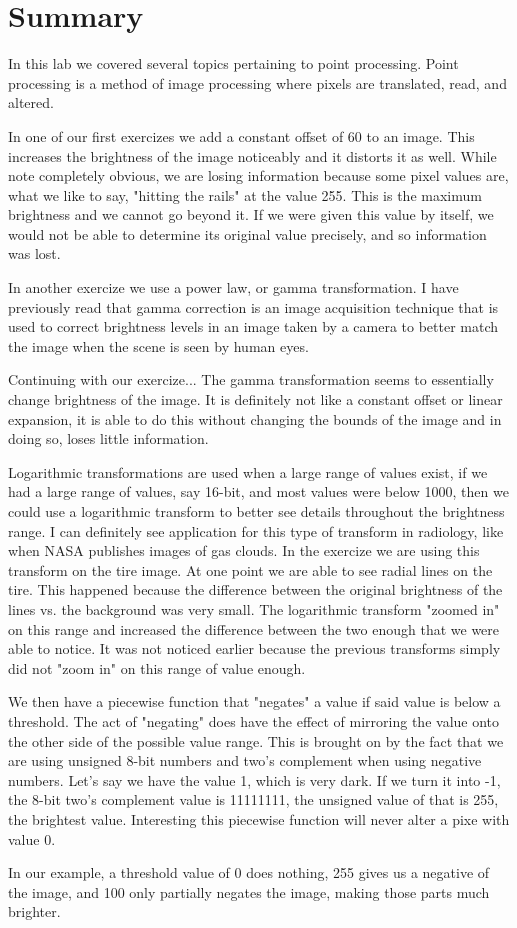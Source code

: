 \section{Summary}

In this lab we covered several topics pertaining to point processing. Point
processing is a method of image processing where pixels are translated, read,
and altered.

In one of our first exercizes we add a constant offset of 60 to an image. This
increases the brightness of the image noticeably and it distorts it as well.
While note completely obvious, we are losing information because some pixel
values are, what we like to say, "hitting the rails" at the value 255. This is
the maximum brightness and we cannot go beyond it. If we were given this value
by itself, we would not be able to determine its original value precisely, and
so information was lost.

In another exercize we use a power law, or gamma transformation. I have
previously read that gamma correction is an image acquisition technique that is
used to correct brightness levels in an image taken by a camera to better match
the image when the scene is seen by human eyes.

Continuing with our exercize... The gamma transformation seems to essentially
change brightness of the image. It is definitely not like a constant offset or
linear expansion, it is able to do this without changing the bounds of the image
and in doing so, loses little information.

Logarithmic transformations are used when a large range of values exist, if we
had a large range of values, say 16-bit, and most values were below 1000, then
we could use a logarithmic transform to better see details throughout the
brightness range. I can definitely see application for this type of transform in
radiology, like when NASA publishes images of gas clouds. In the exercize we are
using this transform on the tire image. At one point we are able to see radial
lines on the tire. This happened because the difference between the original
brightness of the lines vs. the background was very small. The logarithmic
transform "zoomed in" on this range and increased the difference between the two
enough that we were able to notice. It was not noticed earlier because the
previous transforms simply did not "zoom in" on this range of value enough.

We then have a piecewise function that "negates" a value if said value is below
a threshold. The act of "negating" does have the effect of mirroring the value
onto the other side of the possible value range. This is brought on by the fact
that we are using unsigned 8-bit numbers and two's complement when using
negative numbers. Let's say we have the value 1, which is very dark. If we turn
it into -1, the 8-bit two's complement value is 11111111, the unsigned value of
that is 255, the brightest value. Interesting this piecewise function will never
alter a pixe with value 0.

In our example, a threshold value of 0 does nothing, 255 gives us a negative of
the image, and 100 only partially negates the image, making those parts much
brighter.
